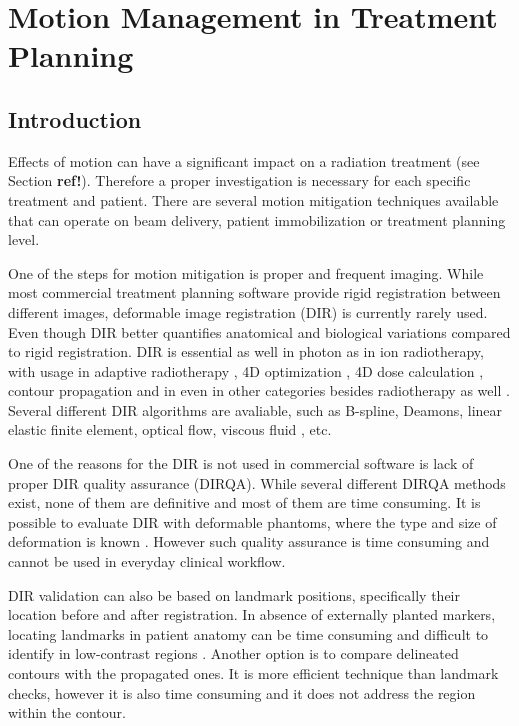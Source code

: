 \documentclass[type=dr, dr=rernat, accentcolor=tud7b,colorbacktitle, bigchapter, openright, twoside, 12pt ]{tudthesis}
\begin{document}
\chapter{Motion Management in Treatment Planning}
\label{chapter:vmm}
\minitoc

\section{Introduction}

Effects of motion can have a significant impact on a radiation treatment (see Section \textbf{ref!}). Therefore a proper investigation is necessary for each specific treatment and patient. There are several motion mitigation techniques available that can operate on beam delivery, patient immobilization or treatment planning level.

One of the steps for motion mitigation is proper and frequent imaging. While most commercial treatment planning software provide rigid registration between different images, deformable image registration (DIR) is currently rarely used. Even though DIR better quantifies anatomical and biological variations \cite{Sarrut2006} compared to rigid registration. DIR is essential as well in photon as in ion radiotherapy, with usage in adaptive radiotherapy \cite{Yan1997,Yan2010}, 4D optimization \cite{Trofimov2005}, 4D dose calculation \cite{Flampouri2006}, contour propagation \cite{Lu2006b} and in even in other categories besides radiotherapy as well \cite{Cleary2010, Herrell2012, Nithiananthan2011, Naini2010}. Several different DIR algorithms are avaliable, such as B-spline, Deamons, linear elastic finite element, optical flow, viscous fluid \cite{Rueckert1999,Venugopal2005,Zhong2007,Thirion1998,Christensen1996}, etc.
	
One of the reasons for the DIR is not used in commercial software is lack of proper DIR quality assurance (DIRQA). While several different DIRQA methods exist, none of them are definitive and most of them are time consuming. It is possible to evaluate DIR with deformable phantoms, where the type and size of deformation is known \cite{Kashani2007, Kirby2011}. However such quality assurance is time consuming and cannot be used in everyday clinical workflow. 

DIR validation can also be based on landmark positions, specifically their location before and after registration. In absence of externally planted markers, locating landmarks in patient anatomy can be time consuming and difficult to identify in low-contrast regions \cite{Varadhan2013}. Another option is to compare delineated contours with the propagated ones. It is more efficient technique than landmark checks, however it is also time consuming and it does not address the region within the contour.
\end{document}
